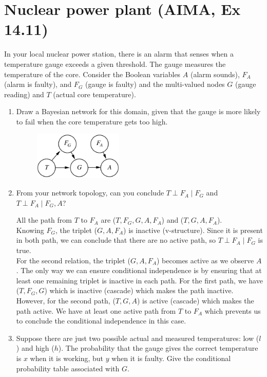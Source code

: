 \documentclass[11pt, a4paper]{article}
\begin{document}
\section{Nuclear power plant (AIMA, Ex 14.11)}

In your local nuclear power station, there is an alarm that senses when a temperature gauge exceeds a given threshold. The gauge measures the temperature of the core. Consider the Boolean variables $A$ (alarm sounds), $F_A$ (alarm is faulty), and $F_G$ (gauge is faulty) and the multi-valued nodes $G$ (gauge reading) and $T$ (actual core temperature).

\begin{enumerate}
    \item Draw a Bayesian network for this domain, given that the gauge is more likely to fail when the core temperature gets too high.

    \begin{solution}
        \begin{figure}[h]
            \centering
            \includegraphics[width=0.4\textwidth]{figures/e3_nuclear.png}
        \end{figure}
    \end{solution}
    
    \item From your network topology, can you conclude $T \perp F_A \mid F_G$ and $T \perp F_A \mid F_G, A$?
    \begin{solution}

    All the path from $T$ to $F_A$ are ($T,F_G,G,A,F_A$) and ($T,G,A,F_A$).\\

    Knowing $F_G$, the triplet ($G, A, F_A$) is inactive (v-structure). Since it is present in both path, we can conclude that there are no active path, so $T \perp F_A \mid F_G$ is true.\\
    
    For the second relation, the triplet ($G, A, F_A$) becomes active as we observe $A$. The only way we can ensure conditional independence is by ensuring that at least one remaining triplet is inactive in each path.
    For the first path, we have ($T, F_G, G$) which is inactive (cascade) which makes the path inactive. However, for the second path, ($T, G, A$) is active (cascade) which makes the path active. We have at least one active path from $T$ to $F_A$ which prevents us to conclude the conditional independence in this case.
    \end{solution}
    \item Suppose there are just two possible actual and measured temperatures: low ($l$) and high ($h$). The probability that the gauge gives the correct temperature is $x$ when it is working, but $y$ when it is faulty. Give the conditional probability table associated with $G$.


\end{enumerate}
\end{document}
